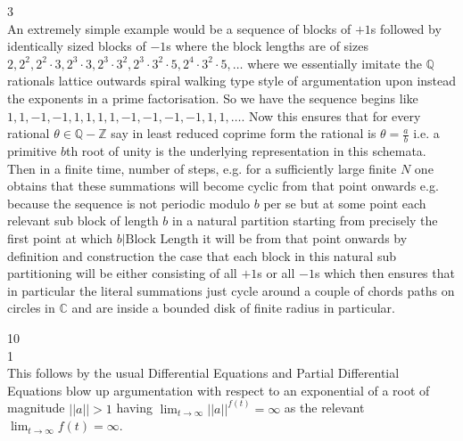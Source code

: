 
3 \\
An extremely simple example would be a sequence of blocks of $+1$s followed by identically sized blocks of $-1$s where the block lengths are of sizes $2,2^2,2^2 \cdot 3,2^3 \cdot 3,2^3 \cdot 3^2,2^3 \cdot 3^2 \cdot 5,2^4 \cdot 3^2 \cdot 5,\dots$ where we essentially imitate the $\mathbb{Q}$ rationals lattice outwards spiral walking type style of argumentation upon instead the exponents in a prime factorisation. So we have the sequence begins like $1,1,-1,-1,1,1,1,1,-1,-1,-1,-1,1,1,\dots$. Now this ensures that for every rational $\theta \in \mathbb{Q} - \mathbb{Z}$ say in least reduced coprime form the rational is $\theta = \frac{a}{b}$ i.e. a primitive $b$th root of unity is the underlying representation in this schemata. Then in a finite time, number of steps, e.g. for a sufficiently large finite $N$ one obtains that these summations will become cyclic from that point onwards e.g. because the sequence is not periodic modulo $b$ per se but at some point each relevant sub block of length $b$ in a natural partition starting from precisely the first point at which $b | \text{Block Length}$ it will be from that point onwards by definition and construction the case that each block in this natural sub partitioning will be either consisting of all $+1$s or all $-1$s which then ensures that in particular the literal summations just cycle around a couple of chords paths on circles in $\mathbb{C}$ and are inside a bounded disk of finite radius in particular.


10 \\
1 \\
This follows by the usual Differential Equations and Partial Differential Equations blow up argumentation with respect to an exponential of a root of magnitude $||a|| > 1$ having $\lim_{t \to \infty} ||a||^{f(t)} = \infty$ as the relevant $\lim_{t \to \infty} f(t) = \infty$.


